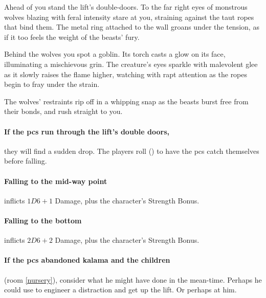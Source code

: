\begin{boxtext}
  Ahead of you stand the lift's double-doors.
  To the far right eyes of monstrous wolves blazing with feral intensity stare at you, straining against the taut ropes that bind them.
  The metal ring attached to the wall groans under the tension, as if it too feels the weight of the beasts' fury.

  Behind the wolves you spot a goblin.
  Its torch casts a glow on its face, illuminating a mischievous grin.
  The creature's eyes sparkle with malevolent glee as it slowly raises the flame higher, watching with rapt attention as the ropes begin to fray under the strain.

  The wolves' restraints rip off in a whipping snap as the beasts burst free from their bonds, and rush straight to you.
\end{boxtext}

\paragraph{If the \glspl{pc} run through the lift's double doors,}
they will find a sudden drop.
The players roll  (\tn[7]) to have the \glspl{pc} catch themselves before falling.

\paragraph{Falling to the mid-way point}
inflicts $1D6+1$ Damage, plus the character's Strength Bonus.

\paragraph{Falling to the bottom}
inflicts $2D6+2$ Damage, plus the character's Strength Bonus.%

\paragraph{If the \glspl{pc} abandoned \gls{kalama} and the children}
(room \vref{nursery}),
consider what he might have done in the mean-time.
Perhaps he could use  to engineer a distraction and get up the lift.
Or perhaps  at him.




